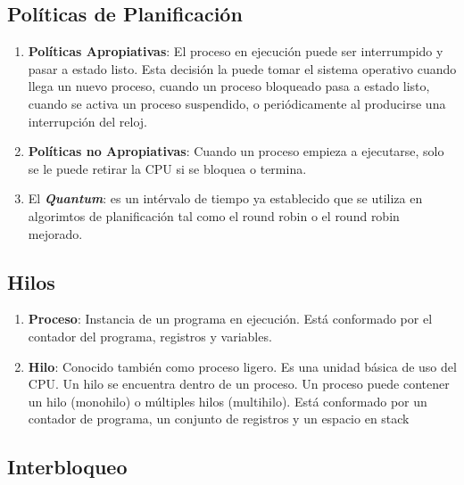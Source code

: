 \documentclass[12pt, a4paper]{article} %
\begin{document}
\subsection{Políticas de Planificación}

\begin{enumerate}[resume*]
	\item \textbf{Políticas Apropiativas}: El proceso en ejecución puede ser interrumpido y pasar a estado listo. Esta decisión la puede tomar el sistema operativo cuando llega un nuevo proceso, cuando un proceso bloqueado pasa a estado listo, cuando se activa un proceso suspendido, o periódicamente al producirse una interrupción del reloj. 
	
	\item \textbf{Políticas no Apropiativas}: Cuando un proceso empieza a ejecutarse, solo se le puede retirar la CPU si se bloquea o termina.
	
	\item El \textbf{\textit{Quantum}}: es un intérvalo de tiempo ya establecido que se utiliza en algorimtos de planificación tal como el round robin o el round robin mejorado.
\end{enumerate}

\subsection{Hilos}

\begin{enumerate}[resume*]
	\item \textbf{Proceso}: Instancia de un programa en ejecución. Está conformado por el contador del programa, registros y variables.
	
	\item \textbf{Hilo}: Conocido también como proceso ligero. Es una unidad básica de uso del CPU. Un hilo se encuentra dentro de un proceso. Un proceso puede contener un hilo (monohilo) o múltiples hilos (multihilo). Está conformado por un contador de programa, un conjunto de registros y un espacio en stack
\end{enumerate}

\subsection{Interbloqueo}
\end{document}
